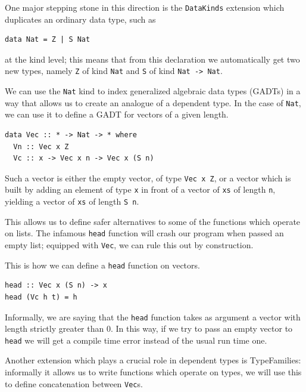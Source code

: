 \documentclass[11pt, titlepage]{article}
\newcommand{\toHaskell}[1]{\texttt{#1}\xspace}
\begin{document}
One major stepping stone in this direction is the \toHaskell{DataKinds} \cite{datakinds} extension which duplicates an ordinary data type, such as

\begin{verbatim}
data Nat = Z | S Nat
\end{verbatim}

at the kind level; this means that from this declaration we automatically get two new types, namely \texttt{Z} of kind \texttt{Nat}
and \texttt{S} of kind \texttt{Nat -> Nat}.

We can use the \texttt{Nat} kind to index generalized algebraic data types (GADTs) in a way that allows us to create an analogue of a dependent type. 
In the case of \texttt{Nat}, we can use it to define a GADT for vectors of a given length.

\begin{verbatim}
data Vec :: * -> Nat -> * where
  Vn :: Vec x Z
  Vc :: x -> Vec x n -> Vec x (S n)
\end{verbatim}

Such a vector is either the empty vector, of type \toHaskell{Vec x Z}, or a vector which is built by adding an element of type \texttt{x} in front of a vector of \texttt{xs} of length \texttt{n}, yielding a vector of \texttt{xs} of length \texttt{S n}.

This allows us to define safer alternatives to some of the functions which
operate on lists. The infamous \texttt{head} function will
crash our program when passed an empty list; equipped with \texttt{Vec}, we can rule this out by construction. 

This is how we can define a \texttt{head} function on vectors.

\begin{verbatim}
head :: Vec x (S n) -> x
head (Vc h t) = h
\end{verbatim}

Informally, we are saying that the \texttt{head} function takes as
argument a vector with length strictly greater than 0. In this way, if we
try to pass an empty vector to \texttt{head} we will get a compile time
error instead of the usual run time one.

Another extension which plays a crucial role in dependent types is TypeFamilies: informally it allows us to write functions which operate on types, we will use this to define concatenation between \texttt{Vec}s.
\end{document}
